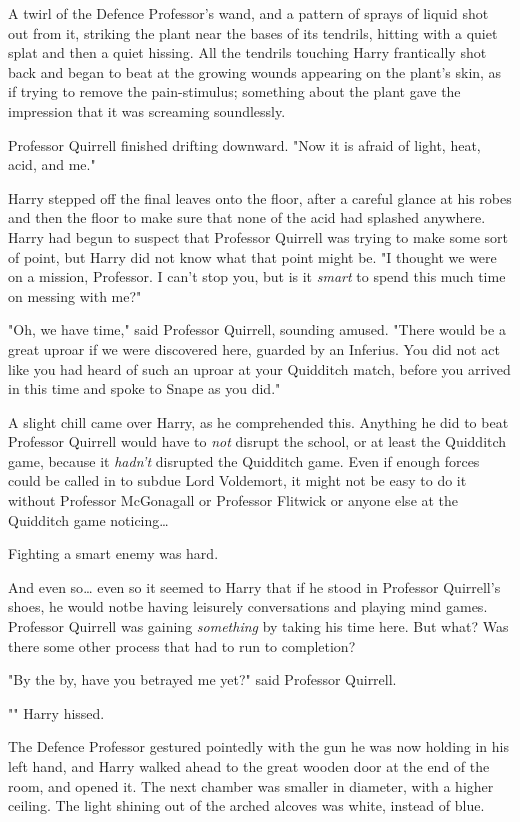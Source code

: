 A twirl of the Defence Professor's wand, and a pattern of sprays of liquid shot
out from it, striking the plant near the bases of its tendrils, hitting with a
quiet splat and then a quiet hissing. All the tendrils touching Harry
frantically shot back and began to beat at the growing wounds appearing on the
plant's skin, as if trying to remove the pain-stimulus; something about the
plant gave the impression that it was screaming soundlessly.

Professor Quirrell finished drifting downward. "Now it is afraid of light,
heat, acid, and me."

Harry stepped off the final leaves onto the floor, after a careful glance at
his robes and then the floor to make sure that none of the acid had splashed
anywhere. Harry had begun to suspect that Professor Quirrell was trying to make
some sort of point, but Harry did not know what that point might be. "I thought
we were on a mission, Professor. I can't stop you, but is it \emph{smart} to
spend this much time on messing with me?"

"Oh, we have time," said Professor Quirrell, sounding amused. "There would be a
great uproar if we were discovered here, guarded by an Inferius. You did not
act like you had heard of such an uproar at your Quidditch match, before you
arrived in this time and spoke to Snape as you did."

A slight chill came over Harry, as he comprehended this. Anything he did to
beat Professor Quirrell would have to \emph{not} disrupt the school, or at
least the Quidditch game, because it \emph{hadn't} disrupted the Quidditch
game. Even if enough forces could be called in to subdue Lord Voldemort, it
might not be easy to do it without Professor McGonagall or Professor Flitwick
or anyone else at the Quidditch game noticing{\ldots}

Fighting a smart enemy was hard.

And even so{\ldots} even so it seemed to Harry that if he stood in Professor
Quirrell's shoes, he would notbe having leisurely conversations and playing
mind games. Professor Quirrell was gaining \emph{something} by taking his time
here. But what? Was there some other process that had to run to completion?

"By the by, have you betrayed me yet?" said Professor Quirrell.

"" Harry hissed.

The Defence Professor gestured pointedly with the gun he was now holding in his
left hand, and Harry walked ahead to the great wooden door at the end of the
room, and opened it.
\later
The next chamber was smaller in diameter, with a higher ceiling. The light
shining out of the arched alcoves was white, instead of blue.

